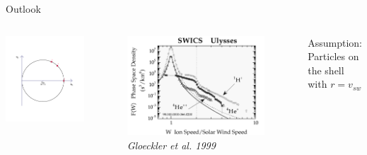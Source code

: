 \documentclass{beamer}
\begin{document}
\begin{frame}{Outlook}
	\begin{columns}
		\column{6cm}
		\flushleft
		\includegraphics[scale=0.9]{pictures/detektor11.pdf}
		\column{5cm}
		\begin{figure}
		\includegraphics[scale=0.18]{pictures/sw_pui_gloeckler.png}
		\caption{\tiny{\textit{Gloeckler et al. 1999}}}		
		\end{figure}
			Assumption: \\Particles on the shell \\with $r = v_{sw}$
	\end{columns}
\end{frame}
\end{document}
